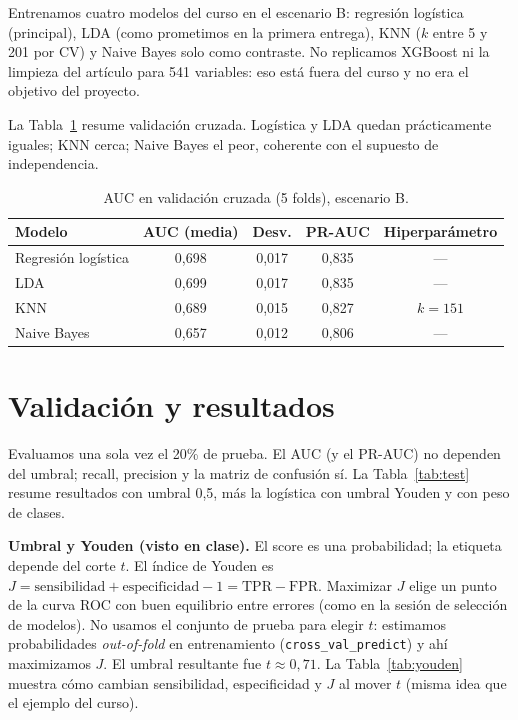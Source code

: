 \documentclass[11pt,a4paper]{article}
\begin{document}
Entrenamos cuatro modelos del curso en el escenario B: regresión logística (principal), LDA (como prometimos en la primera entrega), KNN ($k$ entre 5 y 201 por CV) y Naive Bayes solo como contraste. No replicamos XGBoost ni la limpieza del artículo para 541 variables: eso está fuera del curso y no era el objetivo del proyecto.

La Tabla~\ref{tab:cv} resume validación cruzada. Logística y LDA quedan prácticamente iguales; KNN cerca; Naive Bayes el peor, coherente con el supuesto de independencia.

\begin{table}[H]
  \centering
  \caption{AUC en validación cruzada (5 folds), escenario B.}
  \label{tab:cv}
  \small
  \begin{tabular}{@{}lcccc@{}}
    \toprule
    Modelo & AUC (media) & Desv. & PR-AUC & Hiperparámetro \\
    \midrule
    Regresión logística & 0,698 & 0,017 & 0,835 & --- \\
    LDA & 0,699 & 0,017 & 0,835 & --- \\
    KNN & 0,689 & 0,015 & 0,827 & $k = 151$ \\
    Naive Bayes & 0,657 & 0,012 & 0,806 & --- \\
    \bottomrule
  \end{tabular}
\end{table}

\section{Validación y resultados}

Evaluamos una sola vez el 20\% de prueba. El AUC (y el PR-AUC) no dependen del umbral; recall, precision y la matriz de confusión sí. La Tabla~\ref{tab:test} resume resultados con umbral 0,5, más la logística con umbral Youden y con peso de clases.

\textbf{Umbral y Youden (visto en clase).} El score es una probabilidad; la etiqueta depende del corte $t$. El índice de Youden es $J = \text{sensibilidad} + \text{especificidad} - 1 = \mathrm{TPR} - \mathrm{FPR}$. Maximizar $J$ elige un punto de la curva ROC con buen equilibrio entre errores (como en la sesión de selección de modelos). No usamos el conjunto de prueba para elegir $t$: estimamos probabilidades \emph{out-of-fold} en entrenamiento (\texttt{cross\_val\_predict}) y ahí maximizamos $J$. El umbral resultante fue $t \approx 0{,}71$. La Tabla~\ref{tab:youden} muestra cómo cambian sensibilidad, especificidad y $J$ al mover $t$ (misma idea que el ejemplo del curso).
\end{document}
